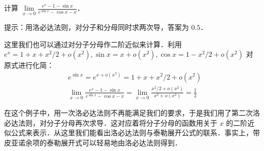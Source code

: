 \begin{exercise}{}
计算 $\lim\limits_{x\rightarrow 0}\frac{e^x-1-\sin x}{e^{\sin x} - \cos x - x}$．
\end{exercise}
提示：用洛必达法则，对分子和分母同时求两次导，答案为 $0.5$．

这里我们也可以通过对分子分母作二阶近似来计算．利用 $e^x=1+x+x^2/2+o(x^2),\sin x=x+o(x^2),\cos x=1-x^2/2+o(x^2)$ 对原式进行化简：
\begin{equation}
\begin{aligned}
&e^{\sin x}=e^{x+o(x^2)}=1+x+x^2/2+o(x^2)\\
&\lim\limits_{x\rightarrow 0}\frac{e^x-1-\sin x}{e^{\sin x} - \cos x - x}=\lim\limits_{x\rightarrow 0}\frac{x^2/2+o(x^2)}{x^2+o(x^2)}=\frac{1}{2}
\end{aligned}
\end{equation}

在这个例子中，用一次洛必达法则不再能满足我们的要求，于是我们用了第二次洛必达法则，对分子分母再次求导．这对应着将分子分母的函数用关于 $x$ 的二阶近似公式来表示．从这里我们能看出洛必达法则与泰勒展开公式的联系．事实上，带皮亚诺余项的泰勒展开式可以轻易地由洛必达法则得到．
